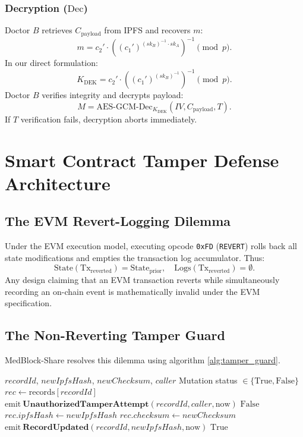 \documentclass[journal,10pt,twocolumn]{IEEEtran}
\begin{document}
\subsubsection{Decryption ($\mathrm{Dec}$)}
Doctor $B$ retrieves $C_{\mathrm{payload}}$ from IPFS and recovers $m$:
\begin{equation}
m = c_2' \cdot \left( (c_1')^{(sk_B)^{-1} \cdot sk_A} \right)^{-1} \pmod p.
\end{equation}
In our direct formulation:
\begin{equation}
K_{\mathrm{DEK}} = c_2' \cdot \left( (c_1')^{(sk_B)^{-1}} \right)^{-1} \pmod p.
\end{equation}
Doctor $B$ verifies integrity and decrypts payload:
\begin{equation}
M = \mathrm{AES\text{-}GCM\text{-}Dec}_{K_{\mathrm{DEK}}}(IV, C_{\mathrm{payload}}, T).
\end{equation}
If $T$ verification fails, decryption aborts immediately.

\section{Smart Contract Tamper Defense Architecture}

\subsection{The EVM Revert-Logging Dilemma}
Under the EVM execution model, executing opcode \texttt{0xFD} (\texttt{REVERT}) rolls back all state modifications and empties the transaction log accumulator. Thus:
\begin{equation}
\mathrm{State}(\mathrm{Tx}_{\mathrm{reverted}}) = \mathrm{State}_{\mathrm{prior}}, \quad \mathrm{Logs}(\mathrm{Tx}_{\mathrm{reverted}}) = \emptyset.
\end{equation}
Any design claiming that an EVM transaction reverts while simultaneously recording an on-chain event is mathematically invalid under the EVM specification.

\subsection{The Non-Reverting Tamper Guard}
MedBlock-Share resolves this dilemma using algorithm \ref{alg:tamper_guard}.
\begin{algorithm}[h]
\caption{Non-Reverting Tamper Defense Guard}
\label{alg:tamper_guard}
\begin{algorithmic}[1]
\REQUIRE $recordId$, $newIpfsHash$, $newChecksum$, $caller$
\ENSURE Mutation status $\in \{\mathrm{True}, \mathrm{False}\}$
\STATE $rec \leftarrow \mathrm{records}[recordId]$
    \STATE $\mathrm{emit} \ \mathbf{UnauthorizedTamperAttempt}(recordId, caller, \mathrm{now})$
    \RETURN $\mathrm{False}$ 
\ENDIF
\STATE $rec.ipfsHash \leftarrow newIpfsHash$
\STATE $rec.checksum \leftarrow newChecksum$
\STATE $\mathrm{emit} \ \mathbf{RecordUpdated}(recordId, newIpfsHash, \mathrm{now})$
\RETURN $\mathrm{True}$
\end{algorithmic}
\end{algorithm}
\end{document}
